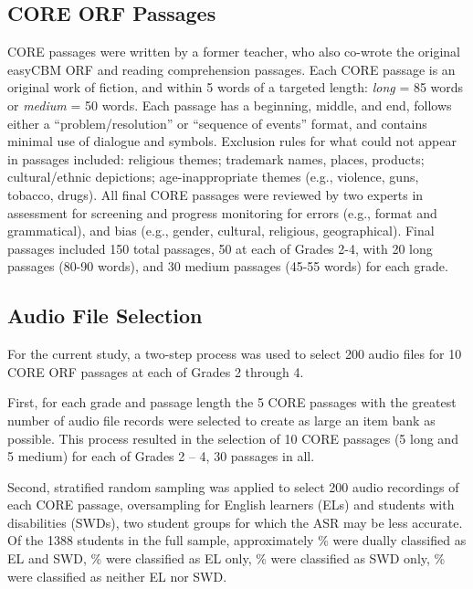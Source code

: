 \documentclass[
]{article}
\begin{document}
\hypertarget{core-orf-passages}{%
\subsection{CORE ORF Passages}\label{core-orf-passages}}

CORE passages were written by a former teacher, who also co-wrote the
original easyCBM ORF and reading comprehension passages. Each CORE
passage is an original work of fiction, and within 5 words of a targeted
length: \emph{long} = 85 words or \emph{medium} = 50 words. Each passage
has a beginning, middle, and end, follows either a
``problem/resolution'' or ``sequence of events'' format, and contains
minimal use of dialogue and symbols. Exclusion rules for what could not
appear in passages included: religious themes; trademark names, places,
products; cultural/ethnic depictions; age-inappropriate themes (e.g.,
violence, guns, tobacco, drugs). All final CORE passages were reviewed
by two experts in assessment for screening and progress monitoring for
errors (e.g., format and grammatical), and bias (e.g., gender, cultural,
religious, geographical). Final passages included 150 total passages, 50
at each of Grades 2-4, with 20 long passages (80-90 words), and 30
medium passages (45-55 words) for each grade.

\hypertarget{audio-file-selection}{%
\subsection{Audio File Selection}\label{audio-file-selection}}

For the current study, a two-step process was used to select 200 audio
files for 10 CORE ORF passages at each of Grades 2 through 4.

First, for each grade and passage length the 5 CORE passages with the
greatest number of audio file records were selected to create as large
an item bank as possible. This process resulted in the selection of 10
CORE passages (5 long and 5 medium) for each of Grades 2 -- 4, 30
passages in all.

Second, stratified random sampling was applied to select 200 audio
recordings of each CORE passage, oversampling for English learners (ELs)
and students with disabilities (SWDs), two student groups for which the
ASR may be less accurate. Of the 1388 students in the full sample,
approximately \% were dually classified as EL and SWD, \% were
classified as EL only, \% were classified as SWD only, \% were
classified as neither EL nor SWD.
\end{document}
